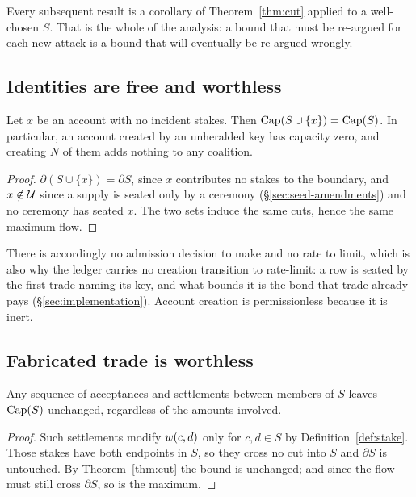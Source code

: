 Every subsequent result is a corollary of Theorem~\ref{thm:cut} applied to a well-chosen
$S$. That is the whole of the analysis: a bound that must be re-argued for each new attack
is a bound that will eventually be re-argued wrongly.

\subsection{Identities are free and worthless}

\begin{corollary}
\label{cor:sybil}
Let $x$ be an account with no incident stakes. Then $\mathrm{Cap}(S\cup\{x\}) = \mathrm{Cap}(S)$.
In particular, an account created by an unheralded key has capacity zero, and creating
$N$ of them adds nothing to any coalition.
\end{corollary}

\begin{proof}
$\partial(S\cup\{x\}) = \partial S$, since $x$ contributes no stakes to the boundary,
and $x\notin\mathcal{U}$ since a supply is seated only by a ceremony
(\S\ref{sec:seed-amendments}) and no ceremony has seated $x$. The two sets induce the
same cuts, hence the same maximum flow.
\end{proof}

There is accordingly no admission decision to make and no rate to limit, which is also why
the ledger carries no creation transition to rate-limit: a row is seated by the first
trade naming its key, and what bounds it is the bond that trade already pays
(\S\ref{sec:implementation}). Account creation is permissionless because it is inert.

\subsection{Fabricated trade is worthless}

\begin{corollary}
\label{cor:wash}
Any sequence of acceptances and settlements between members of $S$ leaves $\mathrm{Cap}(S)$
unchanged, regardless of the amounts involved.
\end{corollary}

\begin{proof}
Such settlements modify $w(c,d)$ only for $c,d\in S$ by Definition~\ref{def:stake}.
Those stakes have both endpoints in $S$, so they cross no cut into $S$ and $\partial S$
is untouched. By Theorem~\ref{thm:cut} the bound is unchanged; and since the flow must
still cross $\partial S$, so is the maximum.
\end{proof}

